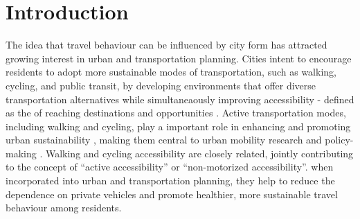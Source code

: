 \documentclass[preprint, 3p,
authoryear]{elsarticle} %
\begin{document}
\section{Introduction}\label{introduction}

The idea that travel behaviour can be influenced by city form has
attracted growing interest in urban and transportation planning. Cities
intent to encourage residents to adopt more sustainable modes of
transportation, such as walking, cycling, and public transit, by
developing environments that offer diverse transportation alternatives
while simultaneaously improving accessibility - defined as the of
reaching destinations and opportunities \citep{iacono2008access}. Active
transportation modes, including walking and cycling, play a important
role in enhancing and promoting urban sustainability
\citep{hino2014built, lamiquiz2015effects}, making them central to urban
mobility research and policy-making
\citep{handy1993regional, clifton2001evaluating, frank2001built, krizek2005perspectives, sallis2004active, vandenbulcke2009mapping, wu2019measuring}.
Walking and cycling accessibility are closely related, jointly
contributing to the concept of ``active accessibility'' or
``non-motorized accessibility''. when incorporated into urban and
transportation planning, they help to reduce the dependence on private
vehicles and promote healthier, more sustainable travel behaviour among
residents.
\end{document}
